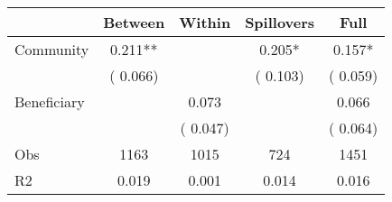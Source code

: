 
\begin{tabular}{l*{4}{c}}\hline&\multicolumn{1}{c}{Between}&\multicolumn{1}{c}{Within}&\multicolumn{1}{c}{Spillovers}&\multicolumn{1}{c}{Full}\\ \hline
 Community             &              0.211**      &                                               &        0.205* &         0.157*                            \\ 
                               &        (       0.066)           &                                       &       (       0.103)     &      (       0.059)                                           \\ 
 Beneficiary   &                                               &        0.073    &                                &             0.066                            \\ 
                               &                                               & (       0.047)                  &                                        &      (       0.064)                                           \\ 
\hline                                                                                                                                                                                                                                            
 Obs                   &               1163               &       1015                       &       724                &              1451                                               \\ 
 R2                    &                      0.019              &              0.001                      &              0.014               &                     0.016                                              \\ 
\hline \end{tabular}                                                                                                                                                                                                              
